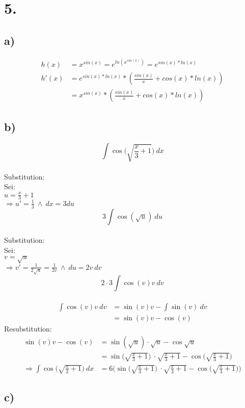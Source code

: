\documentclass[a4paper]{scrartcl}
\begin{document}
\newpage
\section{5.}
\subsection{a)}
\begin{align}
h(x) &= x^{sin(x)} = e^{ln(x^{sin(x)})} = e^{sin(x)*ln(x)} \\
h'(x) &= e^{sin(x)*ln(x)} * (\frac{sin(x)}{x} + cos(x) * ln(x)) \\
 &= x^{sin(x)} * (\frac{sin(x)}{x} + cos(x) * ln(x))
\end{align}
\subsection{b)}
\[\int\cos\Big(\sqrt{\frac{x}{3}+1}\Big)\ dx\]\\
Substitution:\\
Sei:\\
\(u=\frac{x}{3}+1\)\\
\(\Rightarrow u'=\frac{1}{3}\ \land \ dx=3du\)\\
\[3\int\cos(\sqrt{u})\ du\]\\
Substitution:\\
Sei:\\
\(v=\sqrt{u}\)\\
\(\Rightarrow v'=\frac{1}{2\sqrt{u}}=\frac{1}{2v}\ \land \ du=2v\ dv\)\\
\[2\cdot 3\int\cos(v)v\ dv\]\\
\begin{align}
\int\cos(v)v\ dv&=\sin(v)v-\int\sin(v)\ dv\\
	&=\sin(v)v-\cos(v)
\end{align}
Resubstitution:
\begin{align}
\sin(v)v-\cos(v)&=\sin(\sqrt{u})\cdot\sqrt{u}-\cos\sqrt{u}\\
	&=\sin\Big(\sqrt{\frac{x}{3}+1}\Big)\ \cdot\sqrt{\frac{x}{3}+1}-\cos\Big(\sqrt{\frac{x}{3}+1}\Big)\\
	\Rightarrow \int\cos\Big(\sqrt{\frac{x}{3}+1}\Big)\ dx &=6\Bigg(\sin\Big(\sqrt{\frac{x}{3}+1}\Big)\ \cdot\sqrt{\frac{x}{3}+1}-\cos\Big(\sqrt{\frac{x}{3}+1}\Big)\Bigg)
\end{align}
\subsection{c)}
\end{document}
